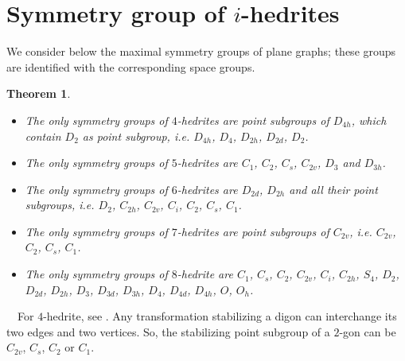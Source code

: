 \documentclass[12pt]{article}
\newtheorem{theor}{Theorem}
\newcommand{\proof}{\noindent{\bf Proof.}\ \ }
\begin{document}
\section{Symmetry group of $i$-hedrites}
We consider below the maximal symmetry groups of plane graphs; these groups are identified with the corresponding space groups.



%
%
%




\begin{theor}
\begin{itemize}
\item[(i)] The only symmetry groups of $4$-hedrites are point subgroups of $D_{4h}$, which contain $D_{2}$ as point subgroup, i.e. $D_{4h}$, $D_4$, $D_{2h}$, $D_{2d}$, $D_2$.

\item[(ii)] The only symmetry groups of $5$-hedrites are $C_1$, $C_2$, $C_s$, $C_{2v}$, $D_3$ and $D_{3h}$.

\item[(iii)] The only symmetry groups of $6$-hedrites are $D_{2d}$, $D_{2h}$ and all their point subgroups, i.e. $D_{2}$, $C_{2h}$, $C_{2v}$, $C_i$, $C_{2}$, $C_{s}$, $C_{1}$.

\item[(iv)] The only symmetry groups of $7$-hedrites are point subgroups of $C_{2v}$, i.e. $C_{2v}$, $C_{2}$, $C_{s}$, $C_{1}$.

\item[(v)] The only symmetry groups of $8$-hedrite are $C_{1}$, $C_s$, $C_2$, $C_{2v}$, $C_i$, $C_{2h}$, $S_4$, $D_2$, $D_{2d}$, $D_{2h}$, $D_3$, $D_{3d}$, $D_{3h}$, $D_4$, $D_{4d}$, $D_{4h}$, $O$, $O_h$.

\end{itemize}


\end{theor}
\proof For $4$-hedrite, see \cite{DSt}. Any transformation stabilizing a digon can interchange its two edges and two vertices. So, the stabilizing point subgroup of a $2$-gon can be $C_{2v}$, $C_s$, $C_2$ or $C_1$.
\end{document}
